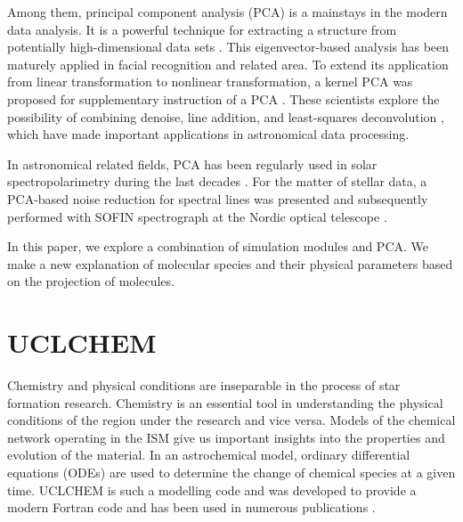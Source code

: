\documentclass{aa}
\begin{document}
\begin{CJK*}{UTF8}{gbsn}
    Among them, principal component analysis (PCA) is a mainstays in the modern data analysis. It is a powerful technique for extracting a structure from potentially high-dimensional data sets \citep{kim2002face}. This eigenvector-based analysis has been maturely applied in facial recognition \citep{turk1991eigenfaces,zhang1997face} and related area. To extend its application from linear transformation to nonlinear transformation, a kernel PCA was proposed for supplementary instruction of a PCA \citep{scholkopf1998nonlinear,muller2001introduction,scholkopf1997kernel}. These scientists explore the possibility of combining denoise, line addition, and least-squares deconvolution \citep{paletou2012critical}, which have made important applications in astronomical data processing.
    
    In astronomical related fields, PCA has been regularly used in solar spectropolarimetry \citep{skumanich2002physical} during the last decades \citep{rees2000fast}. For the matter of stellar data, a PCA-based noise reduction for spectral lines was presented \citep{martinez2008pca} and subsequently performed with SOFIN spectrograph at the Nordic optical telescope \citep{herbig2003high}.
    
    In this paper, we explore a combination of simulation modules and PCA. We make a new explanation of molecular species and their physical parameters based on the projection of molecules.


\section{UCLCHEM}

   Chemistry and physical conditions are inseparable in the process of star formation research. Chemistry is an essential tool in  understanding the physical conditions of the region under the research and vice versa. Models of the chemical network operating in the ISM give us important insights into the properties and evolution of the material. In an astrochemical model, ordinary differential equations (ODEs) are used to determine the change of chemical species at a given time. UCLCHEM is such a modelling code and was developed to provide a modern Fortran code and has been used in numerous publications \citep{viti2004evaporation,roberts2007desorption}.
   

\end{CJK*}
\end{document}
